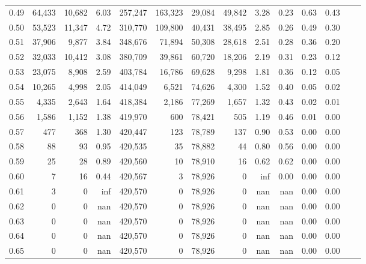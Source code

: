 \begin{tabular}{rrrrrrrrrrrrrr}
0.49 &  64,433 &  10,682 &    6.03 &  257,247 &  163,323 &  29,084 &  49,842 &  3.28 &  0.23 &  0.63 &      0.43 \\
0.50 &  53,523 &  11,347 &    4.72 &  310,770 &  109,800 &  40,431 &  38,495 &  2.85 &  0.26 &  0.49 &      0.30 \\
0.51 &  37,906 &   9,877 &    3.84 &  348,676 &   71,894 &  50,308 &  28,618 &  2.51 &  0.28 &  0.36 &      0.20 \\
0.52 &  32,033 &  10,412 &    3.08 &  380,709 &   39,861 &  60,720 &  18,206 &  2.19 &  0.31 &  0.23 &      0.12 \\
0.53 &  23,075 &   8,908 &    2.59 &  403,784 &   16,786 &  69,628 &   9,298 &  1.81 &  0.36 &  0.12 &      0.05 \\
0.54 &  10,265 &   4,998 &    2.05 &  414,049 &    6,521 &  74,626 &   4,300 &  1.52 &  0.40 &  0.05 &      0.02 \\
0.55 &   4,335 &   2,643 &    1.64 &  418,384 &    2,186 &  77,269 &   1,657 &  1.32 &  0.43 &  0.02 &      0.01 \\
0.56 &   1,586 &   1,152 &    1.38 &  419,970 &      600 &  78,421 &     505 &  1.19 &  0.46 &  0.01 &      0.00 \\
0.57 &     477 &     368 &    1.30 &  420,447 &      123 &  78,789 &     137 &  0.90 &  0.53 &  0.00 &      0.00 \\
0.58 &      88 &      93 &    0.95 &  420,535 &       35 &  78,882 &      44 &  0.80 &  0.56 &  0.00 &      0.00 \\
0.59 &      25 &      28 &    0.89 &  420,560 &       10 &  78,910 &      16 &  0.62 &  0.62 &  0.00 &      0.00 \\
0.60 &       7 &      16 &    0.44 &  420,567 &        3 &  78,926 &       0 &   inf &  0.00 &  0.00 &      0.00 \\
0.61 &       3 &       0 &     inf &  420,570 &        0 &  78,926 &       0 &   nan &   nan &  0.00 &      0.00 \\
0.62 &       0 &       0 &     nan &  420,570 &        0 &  78,926 &       0 &   nan &   nan &  0.00 &      0.00 \\
0.63 &       0 &       0 &     nan &  420,570 &        0 &  78,926 &       0 &   nan &   nan &  0.00 &      0.00 \\
0.64 &       0 &       0 &     nan &  420,570 &        0 &  78,926 &       0 &   nan &   nan &  0.00 &      0.00 \\
0.65 &       0 &       0 &     nan &  420,570 &        0 &  78,926 &       0 &   nan &   nan &  0.00 &      0.00 \\

\end{tabular}
